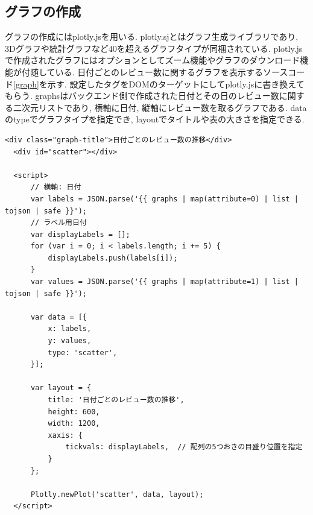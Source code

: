 \subsection{グラフの作成}
グラフの作成にはplotly.js\cite{plotly}を用いる. plotly.sjとはグラフ生成ライブラリであり, 3Dグラフや統計グラフなど40を超えるグラフタイプが同梱されている\cite{plotly}.
plotly.jsで作成されたグラフにはオプションとしてズーム機能やグラフのダウンロード機能が付随している. 
日付ごとのレビュー数に関するグラフを表示するソースコード\ref{graph}を示す. 設定したタグをDOMのターゲットにしてplotly.jsに書き換えてもらう. graphsはバックエンド側で作成された日付とその日のレビュー数に関する二次元リストであり, 横軸に日付, 縦軸にレビュー数を取るグラフである. 
dataのtypeでグラフタイプを指定でき, layoutでタイトルや表の大きさを指定できる. 

\begin{lstlisting}[caption=detail.html, label=graph]
  <div class="graph-title">日付ごとのレビュー数の推移</div>
  <div id="scatter"></div>

  <script>
      // 横軸: 日付
      var labels = JSON.parse('{{ graphs | map(attribute=0) | list | tojson | safe }}');
      // ラベル用日付
      var displayLabels = [];
      for (var i = 0; i < labels.length; i += 5) {
          displayLabels.push(labels[i]);
      }
      var values = JSON.parse('{{ graphs | map(attribute=1) | list | tojson | safe }}');

      var data = [{
          x: labels,
          y: values,
          type: 'scatter',
      }];

      var layout = {
          title: '日付ごとのレビュー数の推移',
          height: 600,
          width: 1200,
          xaxis: {
              tickvals: displayLabels,  // 配列の5つおきの目盛り位置を指定
          }
      };

      Plotly.newPlot('scatter', data, layout);
  </script>
\end{lstlisting}


